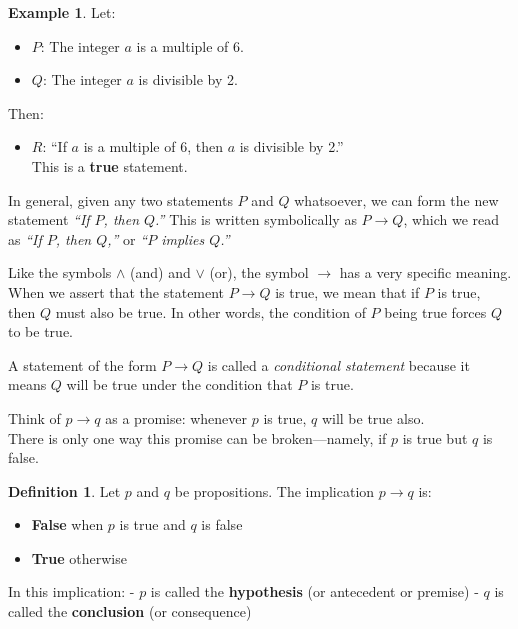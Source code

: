 \documentclass[
]{book}
\providecommand{\tightlist}{%
  \setlength{\itemsep}{0pt}\setlength{\parskip}{0pt}}
\theoremstyle{definition}
\newtheorem{definition}{Definition}[chapter]
\theoremstyle{definition}
\newtheorem{example}{Example}[chapter]
\theoremstyle{definition}
\theoremstyle{definition}
\theoremstyle{remark}
\begin{document}
\begin{example}
\protect\hypertarget{exm:unnamed-chunk-20}{}\label{exm:unnamed-chunk-20}Let:

\begin{itemize}
\tightlist
\item
  \(P\): The integer \(a\) is a multiple of 6.
\item
  \(Q\): The integer \(a\) is divisible by 2.
\end{itemize}

Then:

\begin{itemize}
\tightlist
\item
  \(R\): ``If \(a\) is a multiple of 6, then \(a\) is divisible by 2.''\\
  This is a \textbf{true} statement.
\end{itemize}

In general, given any two statements \(P\) and \(Q\) whatsoever, we can form the new statement \emph{``If \( P \), then \( Q \).''} This is written symbolically as \(P \rightarrow Q\), which we read as \emph{``If \( P \), then \( Q \),''} or \emph{``\( P \) implies \( Q \).''}

Like the symbols \(\land\) (and) and \(\lor\) (or), the symbol \(\rightarrow\) has a very specific meaning. When we assert that the statement \(P \rightarrow Q\) is true, we mean that if \(P\) is true, then \(Q\) must also be true. In other words, the condition of \(P\) being true forces \(Q\) to be true.

A statement of the form \(P \rightarrow Q\) is called a \emph{conditional statement} because it means \(Q\) will be true under the condition that \(P\) is true.
\end{example}

Think of \(p \rightarrow q\) as a promise: whenever \(p\) is true, \(q\) will be true also.\\
There is only one way this promise can be broken---namely, if \(p\) is true but \(q\) is false.

\begin{definition}
\protect\hypertarget{def:unnamed-chunk-21}{}\label{def:unnamed-chunk-21}Let \(p\) and \(q\) be propositions. The implication \(p \rightarrow q\) is:

\begin{itemize}
\tightlist
\item
  \textbf{False} when \(p\) is true and \(q\) is false\\
\item
  \textbf{True} otherwise
\end{itemize}

In this implication:
- \(p\) is called the \textbf{hypothesis} (or antecedent or premise)
- \(q\) is called the \textbf{conclusion} (or consequence)
\end{definition}
\end{document}

